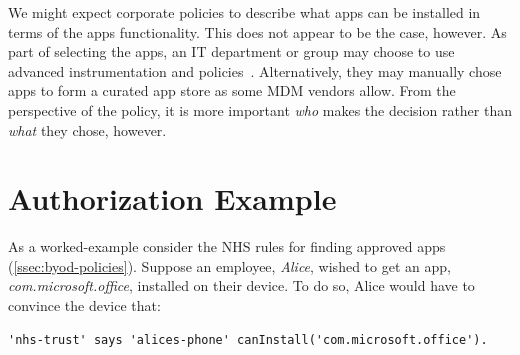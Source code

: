 \documentclass{llncs}
\begin{document}
We might expect corporate policies to describe what apps can be installed in terms of the apps functionality.
This does not appear to be the case, however. 
As part of selecting the apps, an IT department or group may choose to use advanced instrumentation and policies~\cite{armando_enabling_2014}. 
Alternatively, they may manually chose apps to form a curated app store as some \ac{MDM} vendors allow.
From the perspective of the policy, it is more important \emph{who} makes the decision rather than \emph{what} they chose, however.

\section{Authorization Example}

As a worked-example consider the NHS rules for finding approved apps (\autoref{ssec:byod-policies}).
Suppose an employee, \emph{Alice}, wished to get an app, \emph{\ttfamily com.microsoft.office}, installed on their device.
To do so, Alice would have to convince the device that:

\begin{lstlisting}[frame=none]
'nhs-trust' says 'alices-phone' canInstall('com.microsoft.office').
\end{lstlisting}
\end{document}
